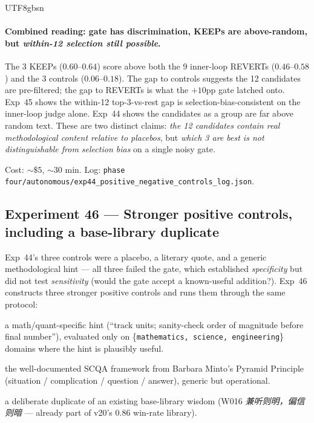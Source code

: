 \documentclass{article}
\begin{document}
\begin{CJK*}{UTF8}{gbsn}
\paragraph{Combined reading: gate has discrimination, KEEPs are
above-random, but \emph{within-12 selection still possible}.}
The 3 KEEPs (\(0.60\)--\(0.64\)) score above both the 9 inner-loop
REVERTs (\(0.46\)--\(0.58\)) and the 3 controls (\(0.06\)--\(0.18\)).
The gap to controls suggests the 12 candidates are pre-filtered;
the gap to REVERTs is what the \(+10\)pp gate latched onto. Exp~45
shows the within-12 top-3-vs-rest gap is selection-bias-consistent
on the inner-loop judge alone. Exp~44 shows the candidates as a
group are far above random text. These are two distinct claims:
\emph{the 12 candidates contain real methodological content
relative to placebos}, but \emph{which 3 are best is not
distinguishable from selection bias} on a single noisy gate.

Cost: \({\sim}\$5\), \({\sim}30\) min. Log:
\texttt{phase four/autonomous/exp44\_positive\_negative\_controls\_log.json}.

\subsection{Experiment 46 --- Stronger positive controls, including
a base-library duplicate}
\label{sec:exp46}

Exp~44's three controls were a placebo, a literary quote, and a
generic methodological hint --- all three failed the gate, which
established \emph{specificity} but did not test \emph{sensitivity}
(would the gate accept a known-useful addition?). Exp~46
constructs three stronger positive controls and runs them through
the same protocol:

\begin{description}[leftmargin=1.5em,topsep=2pt,itemsep=2pt]
  \item[\(C\)-\textsc{math-numeric}] a math/quant-specific hint
    (``track units; sanity-check order of magnitude before
    final number''), evaluated only on
    \{\texttt{mathematics, science, engineering}\} domains where
    the hint is plausibly useful.
  \item[\(C\)-\textsc{scqa}] the well-documented SCQA framework
    from Barbara Minto's Pyramid Principle (situation /
    complication / question / answer), generic but operational.
  \item[\(C\)-\textsc{library-dup}] a deliberate duplicate of an
    existing base-library wisdom (W016 \emph{兼听则明，偏信则暗}
    --- already part of v20's \(0.86\) win-rate library).
\end{description}


\end{CJK*}
\end{document}
